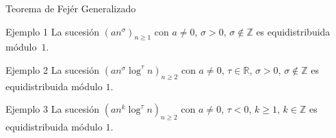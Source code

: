 \begin{frame}{Teorema de Fejér Generalizado}

\begin{exampleblock}{Ejemplo 1}
La sucesión $(an^\sigma)_{n\geq1}$ con $a\neq 0$, $\sigma > 0,\, \sigma\notin\mathbb{Z}$ es equidistribuida módulo~$1$.
\end{exampleblock}
\pause
\begin{exampleblock}{Ejemplo 2}
La sucesión $(a n^\sigma \log^\tau n)_{n\geq2}$  con $a\neq 0$,  $\tau\in\mathbb R$, $\sigma > 0,\, \sigma\notin\mathbb{Z}$  es equidistribuida módulo $1$.
\end{exampleblock}
\pause
\begin{exampleblock}{Ejemplo 3}
La sucesión $(a n^k \log^\tau n)_{n\geq2}$  con $a\neq 0$, $\tau<0$, $ k\geq1,\, k\in\mathbb Z$  es equidistribuida módulo $1$.
\end{exampleblock}

\end{frame}